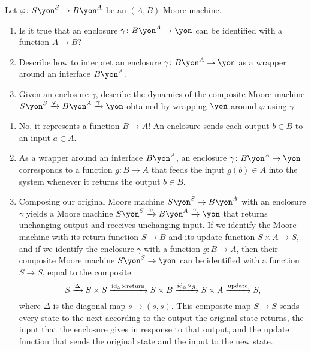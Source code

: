 \documentclass[Book-Poly]{subfiles}
\begin{document}
\begin{exercise} \label{exc.enclosures_as_functions}
Let $\varphi\colon S\yon^S\to B\yon^A$ be an $(A,B)$-Moore machine.
\begin{enumerate}
	\item Is it true that an enclosure $\gamma\colon B\yon^A\to\yon$ can be identified with a function $A\to B$?
	\item Describe how to interpret an enclosure $\gamma\colon B\yon^A\to\yon$ as a wrapper around an interface $B\yon^A$.
	\item Given an enclosure $\gamma$, describe the dynamics of the composite Moore machine $S\yon^S\To{\varphi}B\yon^A\To{\gamma}\yon$ obtained by wrapping $\yon$ around $\varphi$ using $\gamma$.
\qedhere
\end{enumerate}
\begin{solution}
\begin{enumerate}
	\item No, it represents a function $B\to A$!
	An enclosure sends each output $b\in B$ to an input $a\in A$.
	\item As a wrapper around an interface $B\yon^A$, an enclosure $\gamma\colon B\yon^A\to\yon$ corresponds to a function $g\colon B\to A$ that feeds the input $g(b)\in A$ into the system whenever it returns the output $b\in B$.
	\item Composing our original Moore machine $S\yon^S\to B\yon^A$ with an enclosure $\gamma$ yields a Moore machine $S\yon^S\To{\varphi}B\yon^A\To{\gamma}\yon$ that returns unchanging output and receives unchanging input.
	If we identify the Moore machine with its return function $S\to B$ and its update function $S\times A\to S$, and if we identify the enclosure $\gamma$ with a function $g\colon B\to A$, then their composite Moore machine $S\yon^S\to\yon$ can be identified with a function $S\to S$, equal to the composite
	\[
	    S\xrightarrow{\Delta}S\times S\xrightarrow{\mathrm{id}_S\times\text{return}}S\times B\xrightarrow{\mathrm{id}_S\times g}S\times A\xrightarrow{\text{update}}S,
	\]
	where $\Delta$ is the diagonal map $s\mapsto(s,s)$.
	This composite map $S\to S$ sends every state to the next according to the output the original state returns, the input that the enclosure gives in response to that output, and the update function that sends the original state and the input to the new state.
\end{enumerate}
\end{solution}
\end{exercise}
\end{document}
